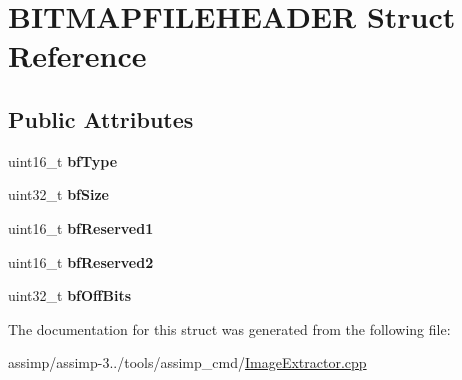 \hypertarget{struct_b_i_t_m_a_p_f_i_l_e_h_e_a_d_e_r}{\section{B\+I\+T\+M\+A\+P\+F\+I\+L\+E\+H\+E\+A\+D\+E\+R Struct Reference}
\label{struct_b_i_t_m_a_p_f_i_l_e_h_e_a_d_e_r}
}
\subsection*{Public Attributes}
\begin{DoxyCompactItemize}
\item 
\hypertarget{struct_b_i_t_m_a_p_f_i_l_e_h_e_a_d_e_r_ad7009278ed4654fa9a67899210174232}{uint16\+\_\+t {\bfseries bf\+Type}}\label{struct_b_i_t_m_a_p_f_i_l_e_h_e_a_d_e_r_ad7009278ed4654fa9a67899210174232}

\item 
\hypertarget{struct_b_i_t_m_a_p_f_i_l_e_h_e_a_d_e_r_a56dd5f349387ec5b5e5f83c7a446d7ac}{uint32\+\_\+t {\bfseries bf\+Size}}\label{struct_b_i_t_m_a_p_f_i_l_e_h_e_a_d_e_r_a56dd5f349387ec5b5e5f83c7a446d7ac}

\item 
\hypertarget{struct_b_i_t_m_a_p_f_i_l_e_h_e_a_d_e_r_aa68cd7c68a8c499985dcc740014c3e53}{uint16\+\_\+t {\bfseries bf\+Reserved1}}\label{struct_b_i_t_m_a_p_f_i_l_e_h_e_a_d_e_r_aa68cd7c68a8c499985dcc740014c3e53}

\item 
\hypertarget{struct_b_i_t_m_a_p_f_i_l_e_h_e_a_d_e_r_a177ef160618144a048c513d1bb41448b}{uint16\+\_\+t {\bfseries bf\+Reserved2}}\label{struct_b_i_t_m_a_p_f_i_l_e_h_e_a_d_e_r_a177ef160618144a048c513d1bb41448b}

\item 
\hypertarget{struct_b_i_t_m_a_p_f_i_l_e_h_e_a_d_e_r_abf9428ac96d16e5e65b9ab5d3465a0af}{uint32\+\_\+t {\bfseries bf\+Off\+Bits}}\label{struct_b_i_t_m_a_p_f_i_l_e_h_e_a_d_e_r_abf9428ac96d16e5e65b9ab5d3465a0af}

\end{DoxyCompactItemize}


The documentation for this struct was generated from the following file\+:\begin{DoxyCompactItemize}
\item 
assimp/assimp-\/3../tools/assimp\+\_\+cmd/\hyperlink{_image_extractor_8cpp}{Image\+Extractor.\+cpp}\end{DoxyCompactItemize}
